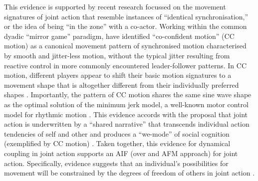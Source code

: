 \begin{CJK}{UTF8}{gbsn}
This evidence is supported by recent research focussed on the movement signatures of joint action that resemble instances of ``identical synchronisation,'' or the idea of being ``in the zone'' with a co-actor. Working within the common dyadic ``mirror game'' paradigm, \textcite{Noy2011,Noy2015,Hart2014} have identified ``co-confident motion'' (CC motion) as a canonical movement pattern of synchronised motion characterised by smooth and jitter-less motion, without the typical jitter resulting from reactive control in more commonly encountered leader-follower patterns.  In CC motion, different players appear to shift their basic motion signatures to a movement shape that is altogether different from their individually preferred shapes \citep{Hart2014}. Importantly, the pattern of CC motion shares the same sine wave shape as the optimal solution of the minimum jerk model, a well-known motor control model for rhythmic motion \citep{Hogan2007}.  This evidence accords with the proposal that joint action is underwritten by a ``shared narrative'' that transcends individual action tendencies of self and other and produces a  ``we-mode'' of social cognition (exemplified by CC motion) \citep{Gallotti2013}.  Taken together, this evidence for dynamical coupling in joint action supports an AIF (over and AFM approach) for joint action.  Specifically, evidence suggests that an individual's possibilities for movement will be constrained by the degrees of freedom of others in joint action \citep{Richardson2015}.








\end{CJK}
